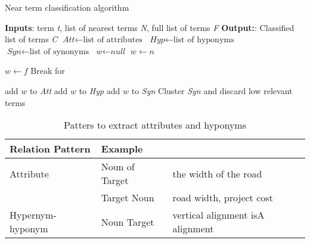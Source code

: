 \documentclass[Journal, InsideFigs, DoubleSpace]{ascelike} %
\begin{document}
%
\begin{algorithm}
	
	\caption{Near term classification algorithm}\label{alg:term_class}
	\begin{algorithmic}[1]
		\State \textbf{Inputs}: term \textit{t}, list of nearest terms \textit{N}, full list of terms \textit{F}
		\State \textbf{Output:}: Classified list of terms \textit{C}
		\State $\textit{Att} \gets \text{list of attributes}$
		\State $\textit{Hyp} \gets \text{list of hyponyms}$
		\State $\textit{Syn} \gets \text{list of synonyms}$
		\State $\textit{w} \gets \textit{null}$
				\State $w \gets n$
	
			\Else
						\State $w \gets f$	
						\State Break for

					\EndIf
				\EndFor
			\EndIf
		\EndFor
			\State add $w$ to \textit{Att}
			\State add $w$ to \textit{Hyp}
		\Else
			\State add $w$ to \textit{Syn}
		\EndIf
		\State Cluster \textit{Syn} and discard low relevant terms

		\EndProcedure
	\end{algorithmic}
\end{algorithm}
%
%
\begin{table} [t]
	\caption{Patters to extract attributes and hyponyms}
	\label{table:attribute_pattern}
	\centering
	\small
	\renewcommand{\arraystretch}{1.25}
	\begin{tabular}{l l l}
		\hline
		\textbf{Relation} \textbf{Pattern} & \textbf{Example}\\
		\hline
		Attribute &	Noun of Target & the width of the road\\
		& Target Noun	&	road width, project cost\\
		Hypernym-hyponym & Noun Target & vertical alignment isA alignment\\
		\hline
	\end{tabular}
	\normalsize
\end{table}
%
\end{document}
